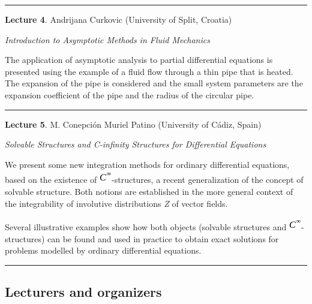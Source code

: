 \documentclass[
]{article}
\begin{document}
\begin{center}\rule{0.5\linewidth}{0.5pt}\end{center}

\textbf{Lecture 4}. Andrijana Curkovic (University of Split, Croatia)

\emph{Introduction to Asymptotic Methods in Fluid Mechanics}

The application of asymptotic analysis to partial differential equations
is presented using the example of a fluid flow through a thin pipe that
is heated. The expansion of the pipe is considered and the small system
parameters are the expansion coefficient of the pipe and the radius of
the circular pipe.

\begin{center}\rule{0.5\linewidth}{0.5pt}\end{center}

\textbf{Lecture 5}. M. Conepción Muriel Patino (University of Cádiz,
Spain)

\emph{Solvable Structures and C-infinity Structures for Differential
Equations}

We present some new integration methods for ordinary differential
equations, based on the existence of
\includegraphics{img/Conchi_html_989b7876ff8a151.gif}-structures, a
recent generalization of the concept of solvable structure. Both notions
are established in the more general context of the integrability of
involutive distributions \emph{Z} of vector fields.

Several illustrative examples show how both objects (solvable structures
and \includegraphics{img/Conchi_html_989b7876ff8a151.gif}-structures)
can be found and used in practice to obtain exact solutions for problems
modelled by ordinary differential equations.

\begin{center}\rule{0.5\linewidth}{0.5pt}\end{center}

\hypertarget{team}{}
\hypertarget{lecturers-and-organizers}{%
\subsection{Lecturers and organizers}\label{lecturers-and-organizers}}
\end{document}
